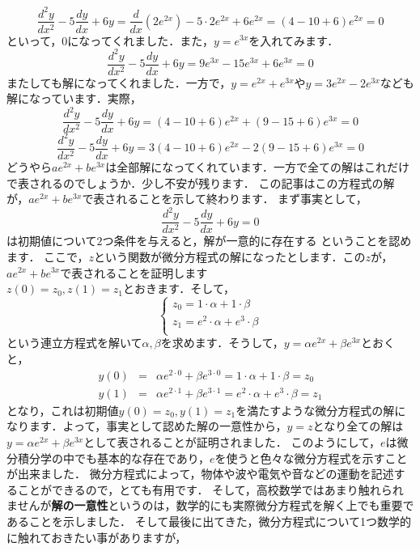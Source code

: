 \[
\frac{d^2 y}{dx^2} - 5 \frac{dy}{dx} + 6y =  \frac{d}{dx}(2e^{2x})  - 5 \cdot 2e^{2x} + 6 e^{2x} = (4-10+6)e^{2x} =0
\]
といって，$0$になってくれました．また，$y=e^{3x}$を入れてみます．
\[
\frac{d^2 y}{dx^2} - 5 \frac{dy}{dx} + 6y =  9 e^{3x} - 15 e^{3x} + 6e^{3x} = 0
\]
またしても解になってくれました．一方で，$y=e^{2x} + e^{3x}$や$y = 3e^{2x} - 2e^{3x}$なども解になっています．実際，
\[
 \frac{d^2 y}{dx^2} - 5 \frac{dy}{dx} + 6y = (4-10+6)e^{2x} + (9 -15 + 6)e^{3x} = 0
\]
\[
 \frac{d^2 y}{dx^2} - 5 \frac{dy}{dx} + 6y = 3(4-10+6)e^{2x} - 2(9 -15 + 6)e^{3x} = 0
\]
どうやら$ae^{2x} + be^{3x}$は全部解になってくれています．一方で全ての解はこれだけで表されるのでしょうか．少し不安が残ります．
この記事はこの方程式の解が，$ae^{2x} + be^{3x}$で表されることを示して終わります．
\exx
まず事実として，
\thm
\[
\frac{d^2 y}{dx^2} - 5 \frac{dy}{dx} + 6y = 0
\]
は初期値について$2$つ条件を与えると，解が一意的に存在する
\thmx
ということを認めます．
\proof
ここで，$z$という関数が微分方程式の解になったとします．この$z$が，$ae^{2x} + be^{3x}$で表されることを証明します\\
$z(0) = z_0 ,z(1) = z_1$とおきます．そして，
\begin{equation*}
\begin{cases}
z_0    = 1\cdot\alpha + 1 \cdot \beta   \\
z_1    = e^2 \cdot\alpha + e^3 \cdot\beta \\
\end{cases}  
\end{equation*}
という連立方程式を解いて$\alpha,\beta$を求めます．そうして，$y = \alpha e^{2x} + \beta e^{3x}$とおくと，
\begin{eqnarray*}
y(0) &=& \alpha e^{2\cdot 0} + \beta e^{3\cdot 0}  = 1\cdot\alpha + 1 \cdot \beta  = z_0\\
y(1) &=& \alpha e^{2\cdot 1} + \beta e^{3\cdot 1}  =e^2 \cdot\alpha + e^3 \cdot\beta = z_1
\end{eqnarray*}
となり，これは初期値$y(0) =z_0 , y(1) =z_1$を満たすような微分方程式の解になります．よって，事実として認めた解の一意性から，$y=z$となり全ての解は$y = \alpha e^{2x} + \beta e^{3x}$として表されることが証明されました．
\proofx
{}
このようにして，$e$は微分積分学の中でも基本的な存在であり，$e$を使うと色々な微分方程式を示すことが出来ました．
微分方程式によって，物体や波や電気や音などの運動を記述することができるので，とても有用です．
そして，高校数学ではあまり触れられませんが\textbf{解の一意性}というのは，数学的にも実際微分方程式を解く上でも重要であることを示しました．
そして最後に出てきた，微分方程式について1つ数学的に触れておきたい事がありますが，

